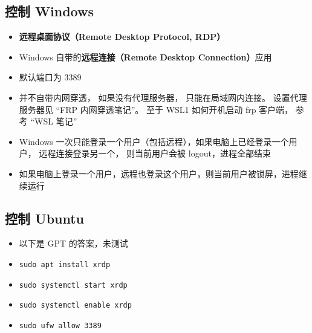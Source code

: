 
\begin{issues}
\issueDraft
\end{issues}

\subsection{控制 Windows}
\begin{itemize}
\item \textbf{远程桌面协议（Remote Desktop Protocol, RDP）}
\item Windows 自带的\textbf{远程连接（Remote Desktop Connection）}应用
\item 默认端口为 3389
\item 并不自带内网穿透， 如果没有代理服务器， 只能在局域网内连接。 设置代理服务器见 “FRP 内网穿透笔记”。 至于 WSL1 如何开机启动 frp 客户端， 参考 “WSL 笔记”
\item Windows 一次只能登录一个用户（包括远程），如果电脑上已经登录一个用户， 远程连接登录另一个， 则当前用户会被 logout，进程全部结束
\item 如果电脑上登录一个用户，远程也登录这个用户，则当前用户被锁屏，进程继续运行
\end{itemize}

\subsection{控制 Ubuntu}
\begin{itemize}
\item 以下是 GPT 的答案，未测试
\item \verb|sudo apt install xrdp|
\item \verb|sudo systemctl start xrdp|
\item \verb|sudo systemctl enable xrdp|
\item \verb|sudo ufw allow 3389|
\end{itemize}
